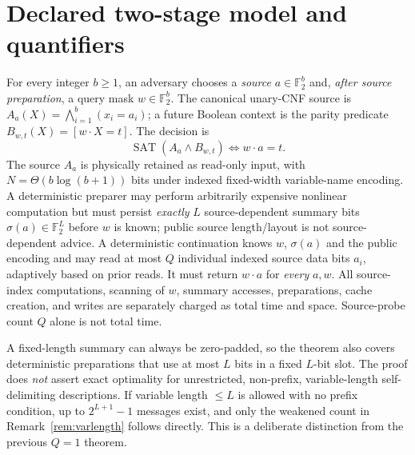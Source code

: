 \documentclass[10pt]{article}
\newcommand{\F}{\mathbb F_2}
\begin{document}
\section{Declared two-stage model and quantifiers}
For every integer $b\ge1$, an adversary chooses a \emph{source} $a\in\F^b$ and, \emph{after source preparation}, a query mask $w\in\F^b$. The canonical unary-CNF source is $A_a(X)=\bigwedge_{i=1}^b(x_i=a_i)$; a future Boolean context is the parity predicate $B_{w,t}(X)=[w\cdot X=t]$. The decision is
\begin{equation}\label{eq:embed}
\operatorname{SAT}(A_a\wedge B_{w,t})\iff w\cdot a=t.
\end{equation}
The source $A_a$ is physically retained as read-only input, with $N=\Theta(b\log(b+1))$ bits under indexed fixed-width variable-name encoding. A deterministic preparer may perform arbitrarily expensive nonlinear computation but must persist \emph{exactly} $L$ source-dependent summary bits $\sigma(a)\in\F^L$ before $w$ is known; public source length/layout is not source-dependent advice. A deterministic continuation knows $w$, $\sigma(a)$ and the public encoding and may read at most $Q$ individual indexed source data bits $a_i$, adaptively based on prior reads. It must return $w\cdot a$ for \emph{every} $a,w$. All source-index computations, scanning of $w$, summary accesses, preparations, cache creation, and writes are separately charged as total time and space. Source-probe count $Q$ alone is not total time.

A fixed-length summary can always be zero-padded, so the theorem also covers deterministic preparations that use at most $L$ bits in a fixed $L$-bit slot. The proof does \emph{not} assert exact optimality for unrestricted, non-prefix, variable-length self-delimiting descriptions. If variable length $\le L$ is allowed with no prefix condition, up to $2^{L+1}-1$ messages exist, and only the weakened count in Remark~\ref{rem:varlength} follows directly. This is a deliberate distinction from the previous $Q=1$ theorem.
\end{document}
